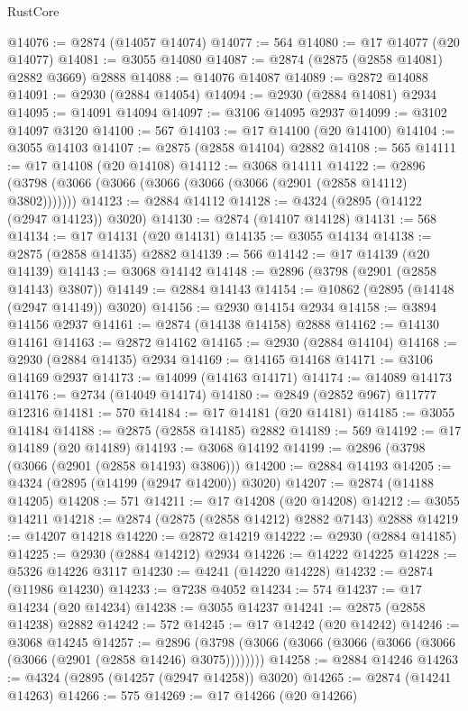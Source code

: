 \begin{lexlean}{RustCore}
\begin{coremodule}
@14076 := @2874 (@14057 @14074)
@14077 := 564
@14080 := @17 @14077 (@20 @14077)
@14081 := @3055 @14080
@14087 := @2874 (@2875 (@2858 @14081) @2882 @3669) @2888
@14088 := @14076 @14087
@14089 := @2872 @14088
@14091 := @2930 (@2884 @14054)
@14094 := @2930 (@2884 @14081) @2934
@14095 := @14091 @14094
@14097 := @3106 @14095 @2937
@14099 := @3102 @14097 @3120
@14100 := 567
@14103 := @17 @14100 (@20 @14100)
@14104 := @3055 @14103
@14107 := @2875 (@2858 @14104) @2882
@14108 := 565
@14111 := @17 @14108 (@20 @14108)
@14112 := @3068 @14111
@14122 := @2896 (@3798 (@3066 (@3066 (@3066 (@3066 (@3066 (@2901 (@2858 @14112) @3802)))))))
@14123 := @2884 @14112
@14128 := @4324 (@2895 (@14122 (@2947 @14123)) @3020)
@14130 := @2874 (@14107 @14128)
@14131 := 568
@14134 := @17 @14131 (@20 @14131)
@14135 := @3055 @14134
@14138 := @2875 (@2858 @14135) @2882
@14139 := 566
@14142 := @17 @14139 (@20 @14139)
@14143 := @3068 @14142
@14148 := @2896 (@3798 (@2901 (@2858 @14143) @3807))
@14149 := @2884 @14143
@14154 := @10862 (@2895 (@14148 (@2947 @14149)) @3020)
@14156 := @2930 @14154 @2934
@14158 := @3894 @14156 @2937
@14161 := @2874 (@14138 @14158) @2888
@14162 := @14130 @14161
@14163 := @2872 @14162
@14165 := @2930 (@2884 @14104)
@14168 := @2930 (@2884 @14135) @2934
@14169 := @14165 @14168
@14171 := @3106 @14169 @2937
@14173 := @14099 (@14163 @14171)
@14174 := @14089 @14173
@14176 := @2734 (@14049 @14174)
@14180 := @2849 (@2852 @967) @11777 @12316
@14181 := 570
@14184 := @17 @14181 (@20 @14181)
@14185 := @3055 @14184
@14188 := @2875 (@2858 @14185) @2882
@14189 := 569
@14192 := @17 @14189 (@20 @14189)
@14193 := @3068 @14192
@14199 := @2896 (@3798 (@3066 (@2901 (@2858 @14193) @3806)))
@14200 := @2884 @14193
@14205 := @4324 (@2895 (@14199 (@2947 @14200)) @3020)
@14207 := @2874 (@14188 @14205)
@14208 := 571
@14211 := @17 @14208 (@20 @14208)
@14212 := @3055 @14211
@14218 := @2874 (@2875 (@2858 @14212) @2882 @7143) @2888
@14219 := @14207 @14218
@14220 := @2872 @14219
@14222 := @2930 (@2884 @14185)
@14225 := @2930 (@2884 @14212) @2934
@14226 := @14222 @14225
@14228 := @5326 @14226 @3117
@14230 := @4241 (@14220 @14228)
@14232 := @2874 (@11986 @14230)
@14233 := @7238 @4052
@14234 := 574
@14237 := @17 @14234 (@20 @14234)
@14238 := @3055 @14237
@14241 := @2875 (@2858 @14238) @2882
@14242 := 572
@14245 := @17 @14242 (@20 @14242)
@14246 := @3068 @14245
@14257 := @2896 (@3798 (@3066 (@3066 (@3066 (@3066 (@3066 (@3066 (@2901 (@2858 @14246) @3075))))))))
@14258 := @2884 @14246
@14263 := @4324 (@2895 (@14257 (@2947 @14258)) @3020)
@14265 := @2874 (@14241 @14263)
@14266 := 575
@14269 := @17 @14266 (@20 @14266)

\end{coremodule}
\end{lexlean}
